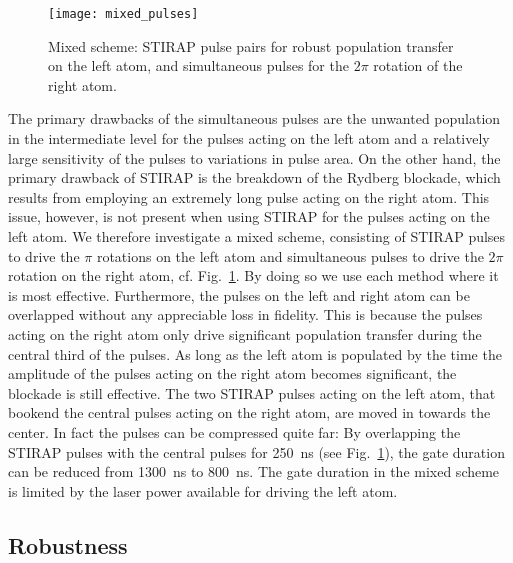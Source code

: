 \begin{figure}[tb]
    \centering\texttt{[image: mixed\_pulses]}
  \caption{%
    Mixed scheme: STIRAP pulse pairs for robust population
    transfer on the left atom, and simultaneous pulses for the $2\pi$
    rotation of the right atom.
  }
  \label{fig:mixed}
\end{figure}
The primary drawbacks of the simultaneous pulses are the
unwanted population in the intermediate level for the pulses acting on
the left atom and a relatively large sensitivity of
the pulses to variations in pulse area.
On the other hand, the primary drawback
of STIRAP is the breakdown of the Rydberg blockade, which
results from employing an extremely long  pulse acting on the right
atom. This issue, however, is  not present when using STIRAP for the
pulses acting on the left atom. We therefore investigate a mixed
scheme, consisting of STIRAP pulses to drive the $\pi$ rotations on
the left atom and simultaneous pulses to drive the $2\pi$ rotation on
the right atom, cf. Fig.~\ref{fig:mixed}. By doing so we
use each method where it is most effective.
Furthermore, the pulses on the left and right atom can be overlapped
without any appreciable loss in fidelity. This is because the
pulses acting on the right atom only drive significant population
transfer during the central third of the pulses. As long as the left
atom is populated by the time the amplitude of the pulses acting on
the right atom becomes significant, the blockade is still effective. The two
STIRAP pulses acting on the left atom, that bookend the central pulses
acting on the right atom, are moved in towards the center.
In fact the pulses can be compressed
quite far: By overlapping the STIRAP pulses
with the central pulses for \SI{250}{ns} (see Fig.~\ref{fig:mixed}),
the gate duration can be
reduced from \SI{1300}{ns} to \SI{800}{ns}. The gate duration in the mixed scheme is
limited by the laser power available for driving the left atom.

\subsection{Robustness}
\label{subsec:RydRobust}

